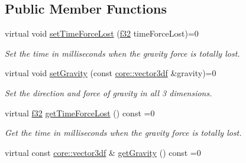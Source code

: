 \subsection*{Public Member Functions}
\begin{DoxyCompactItemize}
\item 
virtual void \hyperlink{classirr_1_1scene_1_1IParticleGravityAffector_a3910d872c740e678373cecbd5523ad38}{set\+Time\+Force\+Lost} (\hyperlink{namespaceirr_a0277be98d67dc26ff93b1a6a1d086b07}{f32} time\+Force\+Lost)=0
\begin{DoxyCompactList}\small\item\em Set the time in milliseconds when the gravity force is totally lost. \end{DoxyCompactList}\item 
\mbox{\label{classirr_1_1scene_1_1IParticleGravityAffector_ad5c31751978d5b0415a36353e4279e77}} 
virtual void \hyperlink{classirr_1_1scene_1_1IParticleGravityAffector_ad5c31751978d5b0415a36353e4279e77}{set\+Gravity} (const \hyperlink{namespaceirr_1_1core_ae6e2b2a6c552833ebbd5b7463d03586b}{core\+::vector3df} \&gravity)=0
\begin{DoxyCompactList}\small\item\em Set the direction and force of gravity in all 3 dimensions. \end{DoxyCompactList}\item 
\mbox{\label{classirr_1_1scene_1_1IParticleGravityAffector_a957d0e0d273e4c2fb4b2cc6017a67038}} 
virtual \hyperlink{namespaceirr_a0277be98d67dc26ff93b1a6a1d086b07}{f32} \hyperlink{classirr_1_1scene_1_1IParticleGravityAffector_a957d0e0d273e4c2fb4b2cc6017a67038}{get\+Time\+Force\+Lost} () const =0
\begin{DoxyCompactList}\small\item\em Get the time in milliseconds when the gravity force is totally lost. \end{DoxyCompactList}\item 
\mbox{\label{classirr_1_1scene_1_1IParticleGravityAffector_ac6368c49867f62a4e873dfd6142abec9}} 
virtual const \hyperlink{namespaceirr_1_1core_ae6e2b2a6c552833ebbd5b7463d03586b}{core\+::vector3df} \& \hyperlink{classirr_1_1scene_1_1IParticleGravityAffector_ac6368c49867f62a4e873dfd6142abec9}{get\+Gravity} () const =0

\end{DoxyCompactItemize}
